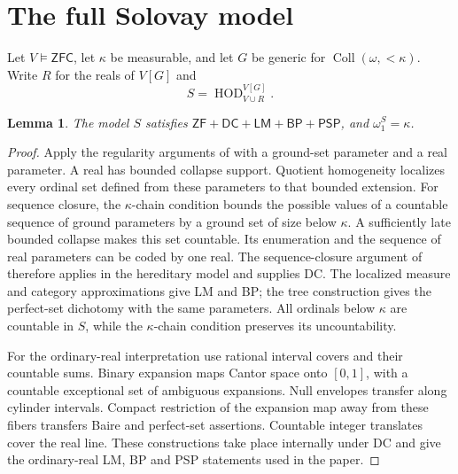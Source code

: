 \documentclass[11pt,a4paper]{amsart}
\newcommand{\ZF}{\ensuremath{\mathsf{ZF}}}
\newcommand{\ZFC}{\ensuremath{\mathsf{ZFC}}}
\newcommand{\DC}{\ensuremath{\mathsf{DC}}}
\newcommand{\HOD}{\ensuremath{\operatorname{HOD}}}
\newcommand{\Coll}{\ensuremath{\operatorname{Coll}}}
\newcommand{\LM}{\ensuremath{\mathsf{LM}}}
\newcommand{\BP}{\ensuremath{\mathsf{BP}}}
\newcommand{\PSP}{\ensuremath{\mathsf{PSP}}}
\newtheorem{lemma}[theorem]{Lemma}
\begin{document}
\section{The full Solovay model}\label{sec:solovay}
Let $V\models\ZFC$, let $\kappa$ be measurable, and let $G$ be generic for $\Coll(\omega,{<}\kappa)$. Write $R$ for the reals of $V[G]$ and
\[
S=\HOD_{V\cup R}^{V[G]}.
\]
\begin{lemma}
The model $S$ satisfies $\ZF+\DC+\LM+\BP+\PSP$, and $\omega_1^S=\kappa$.
\end{lemma}
\begin{proof}
Apply the regularity arguments of \cite[III.1.3--III.1.11]{Solovay} with a ground-set parameter and a real parameter. A real has bounded collapse support. Quotient homogeneity localizes every ordinal set defined from these parameters to that bounded extension. For sequence closure, the $\kappa$-chain condition bounds the possible values of a countable sequence of ground parameters by a ground set of size below $\kappa$. A sufficiently late bounded collapse makes this set countable. Its enumeration and the sequence of real parameters can be coded by one real. The sequence-closure argument of \cite[III.2.4--III.2.11]{Solovay} therefore applies in the hereditary model and supplies DC. The localized measure and category approximations give LM and BP; the tree construction gives the perfect-set dichotomy with the same parameters. All ordinals below $\kappa$ are countable in $S$, while the $\kappa$-chain condition preserves its uncountability.

For the ordinary-real interpretation use rational interval covers and their countable sums. Binary expansion maps Cantor space onto $[0,1]$, with a countable exceptional set of ambiguous expansions. Null envelopes transfer along cylinder intervals. Compact restriction of the expansion map away from these fibers transfers Baire and perfect-set assertions. Countable integer translates cover the real line. These constructions take place internally under DC and give the ordinary-real LM, BP and PSP statements used in the paper.
\end{proof}
\end{document}
